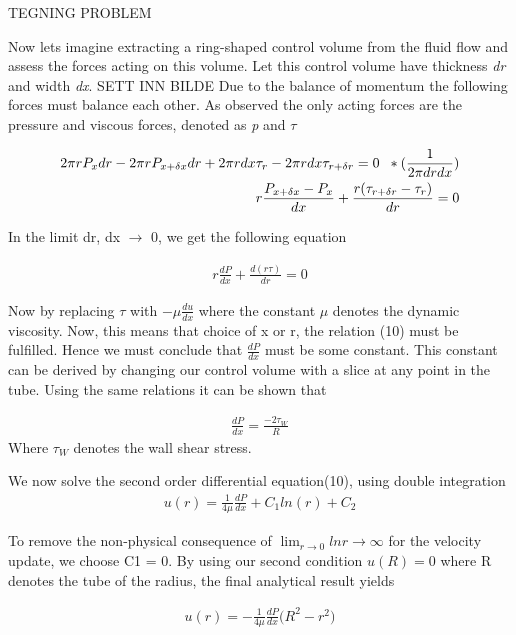 \documentclass[a4paper,norsk]{article}
\begin{document}
TEGNING PROBLEM

Now lets imagine extracting a ring-shaped control volume from the fluid flow and assess the forces acting on this volume.
Let this control volume have thickness \textit{dr} and width \textit{dx}.
SETT INN BILDE
Due to the balance of momentum the following forces must balance each other. As observed the only acting forces are the pressure and
viscous forces, denoted as \textit{p} and \textit{$\tau$}

\begin{align}
2\pi r P_x dr - 2\pi r P_{x+\delta x}dr + 2\pi r dx \tau_{r} - 2\pi r dx \tau_{r+\delta r} = 0 \hspace{2mm}* (\frac{1}{ 2\pi dr dx}) \\
r \frac{P_{x + \delta x} - P_x}{ dx} + \frac{r (\tau_{r + \delta r} - \tau_r)}{dr} = 0
\end{align}

In the limit dr, dx $\rightarrow$ 0, we get the following equation

\begin{align}
r \frac{d P}{d x} + \frac{ d(r \tau)}{d r} = 0
\end{align}

Now by replacing $\tau$ with $-\mu \frac{d u}{d x}$ where the constant $\mu$ denotes the dynamic viscosity. Now, this means that
choice of x or r, the relation (10) must be fulfilled. Hence we must conclude that $\frac{d P}{d x}$ must be some constant. This constant
can be derived by changing our control volume with a slice at any point in the tube. Using the same relations it can be shown that

\begin{align}
\frac{d P}{d x} = \frac{-2 \tau_W}{R}
\end{align}
Where $\tau_W$ denotes the wall shear stress.

We now solve the second order differential equation(10), using double integration
\begin{align}
u(r) = \frac{1}{4 \mu} \frac{dP}{dx} + C_1 ln(r) + C_2
\end{align}

To remove the non-physical consequence of $\lim_{r \to 0} ln r \rightarrow \infty$
for the velocity update, we choose C1 = 0. By using our
second condition $u(R) = 0$ where R denotes the tube of the radius, the final analytical result yields

\begin{align}
u(r) = - \frac{1}{4 \mu}\frac{d P}{d x} \big(R^2 -  r^2 \big)
\end{align}
\end{document}
